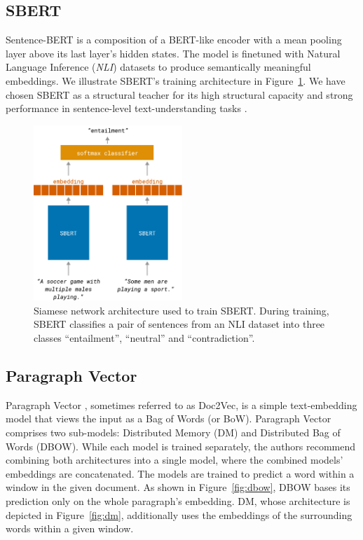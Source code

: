 \subsection{SBERT}

Sentence-BERT is a composition of a BERT-like \citep{devlin2019bert} encoder
with a mean pooling layer above its last layer's hidden states. The model is
finetuned with Natural Language Inference (\emph{NLI}) datasets to produce
semantically meaningful embeddings. We illustrate SBERT's training
architecture in Figure~\ref{fig:sbert}. We have chosen SBERT as a structural
teacher for its high structural capacity and strong performance in
sentence-level text-understanding tasks \citep{reimers2019sentence}.

\begin{figure}
  \centering
  \includegraphics[width=0.5\textwidth]{./img/sbert_architecture.pdf}

  \caption{Siamese network architecture used to train SBERT. During training, SBERT classifies a pair of
  sentences from an NLI dataset into three classes
  ``entailment'', ``neutral'' and ``contradiction''.}

  \label{fig:sbert}

\end{figure}

\subsection{Paragraph Vector}\label{section:paragraph_vector}

Paragraph Vector \citep{le2014distributed}, sometimes referred to as Doc2Vec, is a simple
text-embedding model that views the input as a Bag of Words (or BoW). Paragraph
Vector comprises two sub-models: Distributed Memory (DM) and Distributed Bag of
Words (DBOW). While each model is trained separately, the authors recommend combining both architectures into a single model, where the combined models' embeddings are concatenated. The models are trained to predict a word within a window in the given document. As shown in
Figure~\ref{fig:dbow}, DBOW bases its prediction only on the whole paragraph's embedding. DM, whose architecture is depicted in
Figure~\ref{fig:dm}, additionally uses the embeddings of the surrounding words
within a given window.

